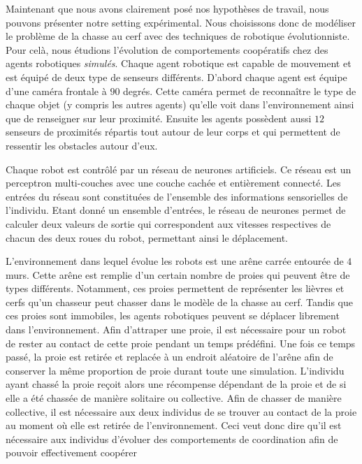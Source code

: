   	Maintenant que nous avons clairement posé nos hypothèses de travail, nous pouvons présenter notre setting expérimental. Nous choisissons donc de modéliser le problème de la chasse au cerf avec des techniques de robotique évolutionniste. Pour celà, nous étudions l'évolution de comportements coopératifs chez des agents robotiques \emph{simulés}. Chaque agent robotique est capable de mouvement et est équipé de deux type de senseurs différents. D'abord chaque agent est équipe d'une caméra frontale à $90$ degrés. Cette caméra permet de reconnaître le type de chaque objet (y compris les autres agents) qu'elle voit dans l'environnement ainsi que de renseigner sur leur proximité. Ensuite les agents possèdent aussi $12$ senseurs de proximités répartis tout autour de leur corps et qui permettent de ressentir les obstacles autour d'eux.

   	Chaque robot est contrôlé par un réseau de neurones artificiels. Ce réseau est un perceptron multi-couches avec une couche cachée et entièrement connecté. Les entrées du réseau sont constituées de l'ensemble des informations sensorielles de l'individu. Etant donné un ensemble d'entrées, le réseau de neurones permet de calculer deux valeurs de sortie qui correspondent aux vitesses respectives de chacun des deux roues du robot, permettant ainsi le déplacement.

   	L'environnement dans lequel évolue les robots est une arêne carrée entourée de $4$ murs. Cette arêne est remplie d'un certain nombre de proies qui peuvent être de types différents. Notamment, ces proies permettent de représenter les lièvres et cerfs qu'un chasseur peut chasser dans le modèle de la chasse au cerf. Tandis que ces proies sont immobiles, les agents robotiques peuvent se déplacer librement dans l'environnement. Afin d'attraper une proie, il est nécessaire pour un robot de rester au contact de cette proie pendant un temps prédéfini. Une fois ce temps passé, la proie est retirée et replacée à un endroit aléatoire de l'arêne afin de conserver la même proportion de proie durant toute une simulation. L'individu ayant chassé la proie reçoit alors une récompense dépendant de la proie et de si elle a été chassée de manière solitaire ou collective. Afin de chasser de manière collective, il est nécessaire aux deux individus de se trouver au contact de la proie au moment où elle est retirée de l'environnement. Ceci veut donc dire qu'il est nécessaire aux individus d'évoluer des comportements de coordination afin de pouvoir effectivement coopérer

